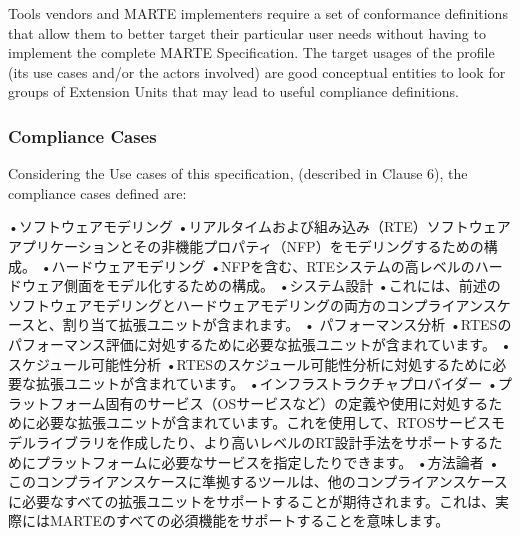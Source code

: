 Tools vendors and MARTE implementers require a set of conformance definitions that allow them to better target their
particular user needs without having to implement the complete MARTE Specification.
The target usages of the profile (its use cases and/or the actors involved) are good conceptual entities to look for groups
of Extension Units that may lead to useful compliance definitions.

\subsubsection{Compliance Cases}

Considering the Use cases of this specification, (described in Clause 6), the compliance cases defined are:


•ソフトウェアモデリング
•リアルタイムおよび組み込み（RTE）ソフトウェアアプリケーションとその非機能プロパティ（NFP）をモデリングするための構成。
•ハードウェアモデリング
•NFPを含む、RTEシステムの高レベルのハードウェア側面をモデル化するための構成。
•システム設計
•これには、前述のソフトウェアモデリングとハードウェアモデリングの両方のコンプライアンスケースと、割り当て拡張ユニットが含まれます。
• パフォーマンス分析
•RTESのパフォーマンス評価に対処するために必要な拡張ユニットが含まれています。
•スケジュール可能性分析
•RTESのスケジュール可能性分析に対処するために必要な拡張ユニットが含まれています。
•インフラストラクチャプロバイダー
•プラットフォーム固有のサービス（OSサービスなど）の定義や使用に対処するために必要な拡張ユニットが含まれています。これを使用して、RTOSサービスモデルライブラリを作成したり、より高いレベルのRT設計手法をサポートするためにプラットフォームに必要なサービスを指定したりできます。
•方法論者
•このコンプライアンスケースに準拠するツールは、他のコンプライアンスケースに必要なすべての拡張ユニットをサポートすることが期待されます。これは、実際にはMARTEのすべての必須機能をサポートすることを意味します。

